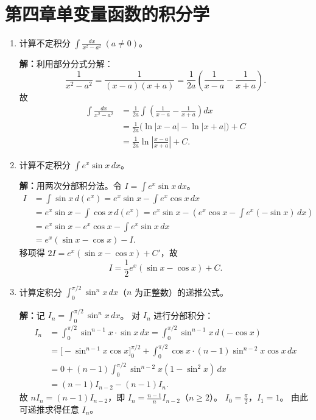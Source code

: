 \documentclass[12pt,a4paper]{ctexart}
\begin{document}
\section*{第四章\quad 单变量函数的积分学}

\begin{enumerate}[leftmargin=*,label=\arabic*.,start=20]
  \item 计算不定积分 $\displaystyle\int \frac{dx}{x^2-a^2}\ (a \neq 0)$。

    \textbf{解：}利用部分分式分解：
    \[
    \frac{1}{x^2-a^2} = \frac{1}{(x-a)(x+a)}
    = \frac{1}{2a}\!\left(\frac{1}{x-a} - \frac{1}{x+a}\right).
    \]
    故
    \begin{align*}
      \int \frac{dx}{x^2-a^2}
      &= \frac{1}{2a}\int\!\left(\frac{1}{x-a} - \frac{1}{x+a}\right) dx \\
      &= \frac{1}{2a}\bigl(\ln|x-a| - \ln|x+a|\bigr) + C \\
      &= \frac{1}{2a}\ln\left|\frac{x-a}{x+a}\right| + C.
    \end{align*}

  \item 计算不定积分 $\displaystyle\int e^x \sin x \, dx$。

    \textbf{解：}用两次分部积分法。令 $I = \int e^x \sin x \, dx$。
    \begin{align*}
      I &= \int \sin x \, d(e^x) = e^x \sin x - \int e^x \cos x \, dx \\
        &= e^x \sin x - \int \cos x \, d(e^x)
         = e^x \sin x - \left(e^x \cos x - \int e^x (-\sin x) \, dx\right) \\
        &= e^x \sin x - e^x \cos x - \int e^x \sin x \, dx \\
        &= e^x(\sin x - \cos x) - I.
    \end{align*}
    移项得 $2I = e^x(\sin x - \cos x) + C'$，故
    \[
    I = \frac{1}{2}e^x(\sin x - \cos x) + C.
    \]

  \item 计算定积分 $\displaystyle\int_0^{\pi/2} \sin^n x \, dx$（$n$ 为正整数）的递推公式。

    \textbf{解：}记 $I_n = \int_0^{\pi/2} \sin^n x \, dx$。
    对 $I_n$ 进行分部积分：
    \begin{align*}
      I_n &= \int_0^{\pi/2} \sin^{n-1} x \cdot \sin x \, dx
           = \int_0^{\pi/2} \sin^{n-1} x \, d(-\cos x) \\
          &= \bigl[-\sin^{n-1} x \cos x\bigr]_0^{\pi/2}
             + \int_0^{\pi/2} \cos x \cdot (n-1)\sin^{n-2} x \cos x \, dx \\
          &= 0 + (n-1)\int_0^{\pi/2} \sin^{n-2} x (1-\sin^2 x) \, dx \\
          &= (n-1)I_{n-2} - (n-1)I_n.
    \end{align*}
    故 $nI_n = (n-1)I_{n-2}$，即 $I_n = \frac{n-1}{n} I_{n-2}$（$n \ge 2$）。
    $I_0 = \frac{\pi}{2}$，$I_1 = 1$。
    由此可递推求得任意 $I_n$。


\end{enumerate}
\end{document}
